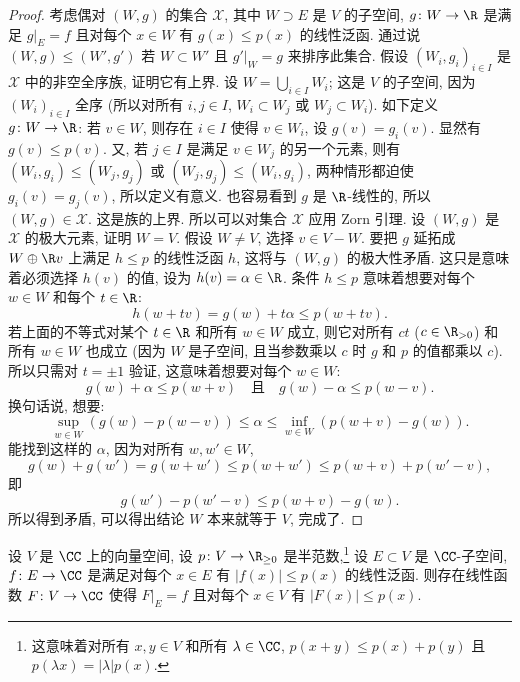 \begin{proof}
考虑偶对 $(W, g)$ 的集合 $\mathcal{X}$, 其中 $W \supset E$ 是 $V$ 的子空间, $g \colon W \to \R$ 是满足 $g|_E = f$ 且对每个 $x \in W$ 有 $g(x) \leq p(x)$ 的线性泛函. 通过说 $(W, g) \leq (W', g')$ 若 $W \subset W'$ 且 $g'|_W = g$ 来排序此集合. 假设 $(W_i, g_i)_{i \in I}$ 是 $\mathcal{X}$ 中的非空全序族, 证明它有上界. 设 $W = \bigcup_{i \in I}W_i$; 这是 $V$ 的子空间, 因为 $(W_i)_{i \in I}$ 全序 (所以对所有 $i, j \in I$, $W_i \subset W_j$ 或 $W_j \subset W_i$). 如下定义 $g \colon W \to \R$: 若 $v \in W$, 则存在 $i \in I$ 使得 $v \in W_i$, 设 $g(v) = g_i(v)$. 显然有 $g(v) \leq p(v)$. 又, 若 $j \in I$ 是满足 $v \in W_j$ 的另一个元素, 则有 $(W_i, g_i) \leq (W_j, g_j)$ 或 $(W_j, g_j) \leq (W_i, g_i)$, 两种情形都迫使 $g_i(v) = g_j(v)$, 所以定义有意义. 也容易看到 $g$ 是 $\R$-线性的, 所以 $(W, g) \in \mathcal{X}$. 这是族的上界.
所以可以对集合 $\mathcal{X}$ 应用 Zorn 引理. 设 $(W, g)$ 是 $\mathcal{X}$ 的极大元素, 证明 $W = V$. 假设 $W \neq V$, 选择 $v \in V - W$. 要把 $g$ 延拓成 $W \oplus \R v$ 上满足 $h \leq p$ 的线性泛函 $h$, 这将与 $(W, g)$ 的极大性矛盾. 这只是意味着必须选择 $h(v)$ 的值, 设为 $h(v) = \alpha \in \R$. 条件 $h \leq p$ 意味着想要对每个 $w \in W$ 和每个 $t \in \R$:
\[
h(w + tv) = g(w) + t\alpha \leq p(w + tv).
\]
若上面的不等式对某个 $t \in \R$ 和所有 $w \in W$ 成立, 则它对所有 $ct$ ($c \in \R_{>0}$) 和所有 $w \in W$ 也成立 (因为 $W$ 是子空间, 且当参数乘以 $c$ 时 $g$ 和 $p$ 的值都乘以 $c$). 所以只需对 $t = \pm 1$ 验证, 这意味着想要对每个 $w \in W$:
\[
g(w) + \alpha \leq p(w + v) \quad \text{且} \quad g(w) - \alpha \leq p(w - v).
\]
换句话说, 想要:
\[
\sup_{w \in W}(g(w) - p(w - v)) \leq \alpha \leq \inf_{w \in W}(p(w + v) - g(w)).
\]
能找到这样的 $\alpha$, 因为对所有 $w, w' \in W$,
\[
g(w) + g(w') = g(w + w') \leq p(w + w') \leq p(w + v) + p(w' - v),
\]
即
\[
g(w') - p(w' - v) \leq p(w + v) - g(w).
\]
所以得到矛盾, 可以得出结论 $W$ 本来就等于 $V$, 完成了.
\end{proof}

\begin{theorem}
\label{thm:B.3.2}
设 $V$ 是 $\CC$ 上的向量空间, 设 $p \colon V \to \R_{\geq 0}$ 是半范数,\footnote{这意味着对所有 $x, y \in V$ 和所有 $\lambda \in \CC$, $p(x + y) \leq p(x) + p(y)$ 且 $p(\lambda x) = |\lambda|p(x)$.} 设 $E \subset V$ 是 $\CC$-子空间, $f \colon E \to \CC$ 是满足对每个 $x \in E$ 有 $|f(x)| \leq p(x)$ 的线性泛函.
则存在线性函数 $F \colon V \to \CC$ 使得 $F|_E = f$ 且对每个 $x \in V$ 有 $|F(x)| \leq p(x)$.
\end{theorem}

